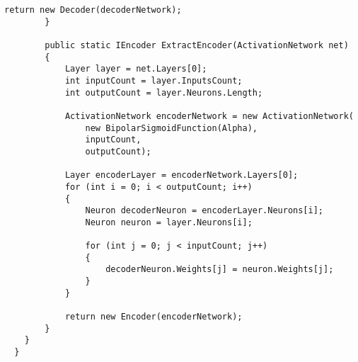 \begin{lstlisting}[style=csharpinlinestyle,caption={Обучение нейронной сети}, label=lst:appendix:neuro_learning]
  			return new Decoder(decoderNetwork);
  		}

  		public static IEncoder ExtractEncoder(ActivationNetwork net)
  		{
  			Layer layer = net.Layers[0];
  			int inputCount = layer.InputsCount;
  			int outputCount = layer.Neurons.Length;

  			ActivationNetwork encoderNetwork = new ActivationNetwork(
  				new BipolarSigmoidFunction(Alpha),
  				inputCount,
  				outputCount);

  			Layer encoderLayer = encoderNetwork.Layers[0];
  			for (int i = 0; i < outputCount; i++)
  			{
  				Neuron decoderNeuron = encoderLayer.Neurons[i];
  				Neuron neuron = layer.Neurons[i];

  				for (int j = 0; j < inputCount; j++)
  				{
  					decoderNeuron.Weights[j] = neuron.Weights[j];
  				}
  			}

  			return new Encoder(encoderNetwork);
  		}
  	}
  }
\end{lstlisting}
